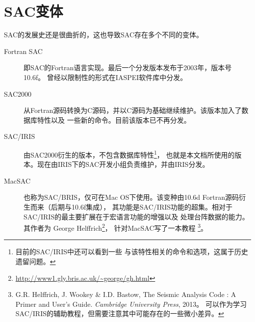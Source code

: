 \section{SAC变体}

SAC的发展史还是很曲折的，这也导致SAC存在多个不同的变体。

\begin{description}
\item[Fortran SAC]  即SAC的Fortran语言实现。最后一个分发版本发布于2003年，版本号10.6f。
                    曾经以限制性的形式在IASPEI软件库中分发。
\item[SAC2000]      从Fortran源码转换为C源码，并以C源码为基础继续维护。该版本加入了数据库特性以及
                    一些新的命令。目前该版本已不再分发。
\item[SAC/IRIS]     由SAC2000衍生的版本，不包含数据库特性\footnote{目前的SAC/IRIS中还可以看到一些
                    与该特性相关的命令和选项，这属于历史遗留问题。}，
                    也就是本文档所使用的版本。现在由IRIS下的SAC开发小组负责维护，并由IRIS分发。
\item[MacSAC]       也称为SAC/BRIS，仅可在Mac OS下使用。该变种由10.6d Fortran源码衍生而来（后期与10.6f集成），
                    其功能是SAC/IRIS功能的超集。相对于SAC/IRIS的最主要扩展在于宏语言功能的增强以及
                    处理台阵数据的能力。其作者为
                    George Helffrich\footnote{\url{http://www1.gly.bris.ac.uk/~george/gh.html}}，
                    针对MacSAC写了一本教程
                    \footnote{G.R. Helffrich, J. Wookey \& I.D. Bastow, The Seismic Analysis Code
                    : A Primer and User's Guide. \textsl{Cambridge University Press}, 2013。
                    可以作为学习SAC/IRIS的辅助教程，但需要注意其中可能存在的一些微小差异。}。
\end{description}
